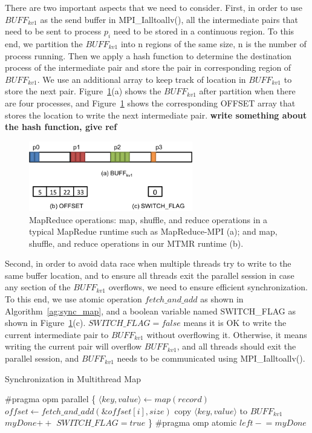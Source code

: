 There are two important aspects that we need to consider.
First, in order to use $BUFF_{kv1}$ as the send buffer in MPI\_Ialltoallv(),
all the intermediate pairs that need to be sent to process $p_{i}$ need
to be stored in a continuous region. To this end, we partition
the $BUFF_{kv1}$ into n regions of the same size, n is the number
of process running. Then we apply a hash function to determine
the destination process of the intermediate pair and store
the pair in corresponding region of $BUFF_{kv1}$. 
We use an additional array to keep track of location in $BUFF_{kv1}$
to store the next pair. Figure~\ref{fig:map_data_structures}(a) shows
the $BUFF_{kv1}$ after partition when there are four processes,
and Figure~\ref{fig:map_data_structures} shows the corresponding OFFSET array
that stores the location to write the next intermediate pair.
\textbf{write something about the hash function, give ref}
\begin{figure}[!htb]
\centering
  \includegraphics[width=0.9\linewidth,height=1.2in]{figs/map_data_structures.png}
  \caption{MapReduce operations: map, shuffle, and reduce operations in a
  typical MapRedue runtime such as MapReduce-MPI (a); and map, shuffle, and
  reduce operations in our MTMR runtime (b).}
  \label{fig:map_data_structures}
\end{figure}

Second, in order to avoid data race when multiple threads
try to write to the same buffer location,  and to ensure all threads exit
the parallel session in case any section of the $BUFF_{kv1}$ overflows, 
we need to ensure efficient synchronization. To this end, 
we use atomic operation $fetch\_and\_add$ as shown in
Algorithm~\ref{ag:sync_map}, and
a boolean variable named SWITCH\_FLAG as shown in 
Figure~\ref{fig:map_data_structures}(c).
$SWITCH\_FLAG  = false$ means it is OK to write the current
intermediate pair to $BUFF_{kv1}$ without overflowing it. Otherwise,
it means writing the current pair will overflow $BUFF_{kv1}$, and 
all threads should exit the parallel session, and $BUFF_{kv1}$ 
needs to be communicated using MPI\_Ialltoallv().
\begin{algorithm}
\caption{Synchronization in Multithread Map}
\label{ag:sync_map}
\begin{algorithmic}[1]
\State \#pragma opm parallel
\State \{
\State $\langle key, value \rangle \gets map(record)$
\State $offset \gets fetch\_and\_add(\&offset[i], size)$
\State copy $\langle key, value \rangle$ to $BUFF_{kv1}$
\State $myDone\mathrel{++}$
\Else
\State $SWITCH\_FLAG = true$
\EndIf
\EndWhile
\State \}
\State \#pragma omp atomic
\State $left \mathrel{-}= myDone$
\EndWhile
\end{algorithmic}
\end{algorithm}


